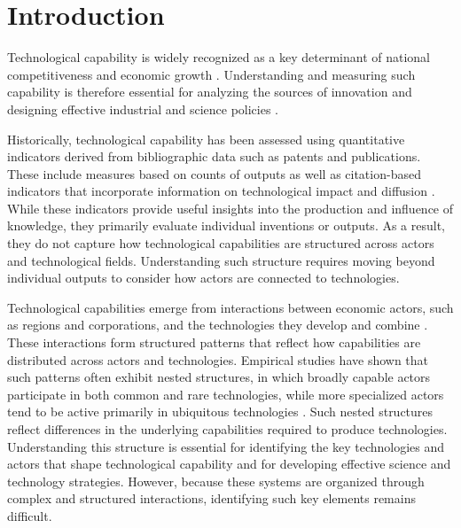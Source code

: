 \documentclass[lineno,pdflatex,sn-mathphys-num]{sn-jnl}%
\theoremstyle{thmstyleone}%
\theoremstyle{thmstyletwo}%
\theoremstyle{thmstylethree}%
\begin{document}
\maketitle

\section{Introduction}\label{section:Introduction}

Technological capability is widely recognized as a key determinant of national competitiveness and economic growth \cite{EC_SSP_nodate,Teixeira2022,NISTEP_nodate}.
Understanding and measuring such capability is therefore essential for analyzing the sources of innovation and designing effective industrial and science policies \cite{gault2023handbook}.

Historically, technological capability has been assessed using quantitative indicators derived from bibliographic data such as patents and publications.
These include measures based on counts of outputs as well as citation-based indicators that incorporate information on technological impact and diffusion \cite{jaffe2019patent,aristodemou2018citations}.
While these indicators provide useful insights into the production and influence of knowledge, they primarily evaluate individual inventions or outputs.
As a result, they do not capture how technological capabilities are structured across actors and technological fields.
Understanding such structure requires moving beyond individual outputs to consider how actors are connected to technologies.

Technological capabilities emerge from interactions between economic actors, such as regions and corporations, and the technologies they develop and combine \cite{katz2016complex}.
These interactions form structured patterns that reflect how capabilities are distributed across actors and technologies.
Empirical studies have shown that such patterns often exhibit nested structures, in which broadly capable actors participate in both common and rare technologies, while more specialized actors tend to be active primarily in ubiquitous technologies \cite{hidalgo2009eci, ren2020bridging}.
Such nested structures reflect differences in the underlying capabilities required to produce technologies.
Understanding this structure is essential for identifying the key technologies and actors that shape technological capability and for developing effective science and technology strategies.
However, because these systems are organized through complex and structured interactions, identifying such key elements remains difficult.
\end{document}
